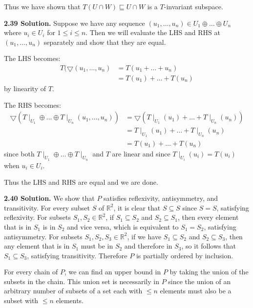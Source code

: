 Thus we have shown that $T(U \cap W) \sqsubseteq U \cap W$ is a $T$-invariant subspace.

\textbf{2.39 Solution.} Suppose we have any sequence $(u_1,\ldots,u_n) \in U_1 \oplus \ldots \oplus U_n$ where $u_i \in U_i$ for $1 \leq i \leq n$. Then we will evaluate the LHS and RHS at $(u_1,\ldots,u_n)$ separately and show that they are equal.

The LHS becomes:
\begin{align*}
    T(\bigtriangledown(u_1,\ldots,u_n) &= T(u_1 + \ldots + u_n) \\
                                       &= T(u_1) + \ldots + T(u_n)
\end{align*}
by linearity of $T$.

The RHS becomes:
\begin{align*}
    \bigtriangledown(T\mid_{U_1} \oplus \ldots \oplus T\mid_{U_n}(u_1,\ldots,u_n)) &= \bigtriangledown(T\mid_{U_1}(u_1) + \ldots + T\mid_{U_n}(u_n)) \\
                                 &= T\mid_{U_1}(u_1) + \ldots + T\mid_{U_n}(u_n) \\
                                 &= T(u_1) + \ldots + T(u_n)
\end{align*}
since both $T\mid_{U_1}\oplus\ldots\oplus T\mid_{U_n}$ and $T$ are linear and since $T\mid_{U_i}(u_i) = T(u_i)$ when $u_i \in U_i$.

Thus the LHS and RHS are equal and we are done.

\textbf{2.40 Solution.} We show that $P$ satisfies reflexivity, antisymmetry, and transitivity. For every subset $S$ of $\mathbb{R}^2$, it is clear that $S\subseteq S$ since $S=S$, satisfying reflexivity. For subsets $S_1,S_2\in\mathbb{R}^2$, if $S_1\subseteq S_2$ and $S_2\subseteq S_1$, then every element that is in $S_1$ is in $S_2$ and vice versa, which is equivalent to $S_1=S_2$, satisfying antisymmetry. For subsets $S_1,S_2,S_3\in\mathbb{R}^2$, if we have $S_1\subseteq S_2$ and $S_2\subseteq S_3$, then any element that is in $S_1$ must be in $S_2$ and therefore in $S_3$, so it follows that $S_1\subseteq S_3$, satisfying transitivity. Therefore $P$ is partially ordered by inclusion. 

For every chain of $P$, we can find an upper bound in $P$ by taking the union of the subsets in the chain. This union set is necessarily in $P$ since the union of an arbitrary number of subsets of a set each with $\leq n$ elements must also be a subset with $\leq n$ elements.

